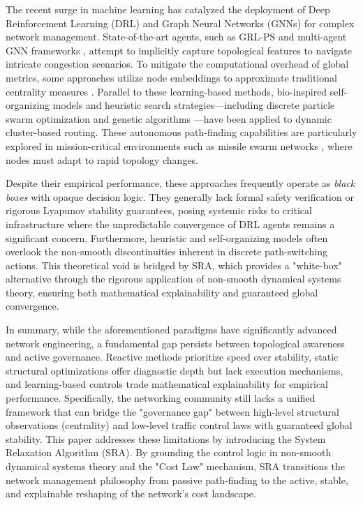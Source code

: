 \documentclass{ccjnl}
\begin{document}
The recent surge in machine learning has catalyzed the deployment of Deep Reinforcement Learning (DRL) and Graph Neural Networks (GNNs) for complex network management. State-of-the-art agents, such as GRL-PS \cite{Wei2023GRLPS} and multi-agent GNN frameworks \cite{Feng2025MultiAgentGNN}, attempt to implicitly capture topological features to navigate intricate congestion scenarios. To mitigate the computational overhead of global metrics, some approaches utilize node embeddings to approximate traditional centrality measures \cite{Mendonca2021ApproxCentrality}. Parallel to these learning-based methods, bio-inspired self-organizing models \cite{Cheng2010SelfOrganizingModel, Guo2010HybridSelfOrg, Li2014PhysarumMulticast} and heuristic search strategies—including discrete particle swarm optimization \cite{Wang2019DPSO} and genetic algorithms \cite{Mu2024CarrierSelfOrg}—have been applied to dynamic cluster-based routing. These autonomous path-finding capabilities are particularly explored in mission-critical environments such as missile swarm networks \cite{Lu2022MissileSwarm,ma2021credibility}, where nodes must adapt to rapid topology changes.

Despite their empirical performance, these approaches frequently operate as \textit{black boxes} with opaque decision logic. They generally lack formal safety verification or rigorous Lyapunov stability guarantees, posing systemic risks to critical infrastructure where the unpredictable convergence of DRL agents remains a significant concern. Furthermore, heuristic and self-organizing models often overlook the non-smooth discontinuities inherent in discrete path-switching actions. This theoretical void is bridged by SRA, which provides a "white-box" alternative through the rigorous application of non-smooth dynamical systems theory, ensuring both mathematical explainability and guaranteed global convergence.

In summary, while the aforementioned paradigms have significantly advanced network engineering, a fundamental gap persists between topological awareness and active governance. Reactive methods prioritize speed over stability, static structural optimizations offer diagnostic depth but lack execution mechanisms, and learning-based controls trade mathematical explainability for empirical performance. Specifically, the networking community still lacks a unified framework that can bridge the "governance gap" between high-level structural observations (centrality) and low-level traffic control laws with guaranteed global stability. This paper addresses these limitations by introducing the System Relaxation Algorithm (SRA). By grounding the control logic in non-smooth dynamical systems theory and the "Cost Law" mechanism, SRA transitions the network management philosophy from passive path-finding to the active, stable, and explainable reshaping of the network's cost landscape.
\end{document}
